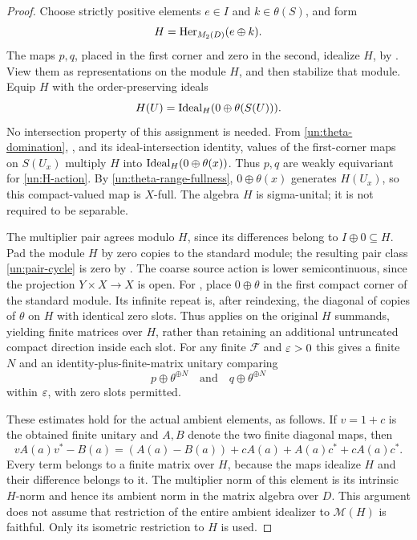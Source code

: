 \begin{proof}
Choose strictly positive elements $e\in I$ and $k\in\theta(S)$,
and form
\[
 H=\operatorname{Her}_{M_2(D)}(e\oplus k).
\]
The maps $p,q$, placed in the first corner and zero in the second,
idealize $H$, by .  View them as
representations on the module $H$, and then stabilize that module.
Equip $H$ with the order-preserving ideals
\begin{equation}\label{un:H-action}
 H(U)=\operatorname{Ideal}_H(0\oplus\theta(S(U))).
\end{equation}
No intersection property of this assignment is needed.  From
\eqref{un:theta-domination}, , and its
ideal-intersection identity, values of the first-corner maps on
$S(U_x)$ multiply $H$ into
$\operatorname{Ideal}_H(0\oplus\theta(x))$.  Thus $p,q$ are weakly equivariant
for \eqref{un:H-action}.  By \eqref{un:theta-range-fullness},
$0\oplus\theta(x)$ generates $H(U_x)$, so this compact-valued map
is $X$-full.  The algebra $H$ is sigma-unital; it is not required
to be separable.

The multiplier pair agrees modulo $H$, since its differences
belong to $I\oplus0\subseteq H$.  Pad the module $H$ by zero
copies to the standard module; the resulting pair class
\eqref{un:pair-cycle} is zero by .
The coarse source action is lower semicontinuous, since the
projection $Y\times X\to X$ is open.  For
, place $0\oplus\theta$ in the first
compact corner of the standard module.  Its infinite repeat
is, after reindexing, the diagonal of copies of $\theta$ on $H$
with identical zero slots.  Thus 
applies on the original $H$ summands, yielding finite matrices
over $H$, rather than retaining an additional untruncated compact
direction inside each slot.  For any finite $\mathcal F$ and
$\varepsilon>0$ this gives a finite $N$ and an identity-plus-finite-matrix
unitary comparing
\begin{equation}\label{un:finite-spare-comparison}
 p\oplus\theta^{\oplus N}
 \quad\text{and}\quad
 q\oplus\theta^{\oplus N}
\end{equation}
within $\varepsilon$, with zero slots permitted.

These estimates hold for the actual ambient elements, as follows.
If $v=1+c$ is the obtained finite unitary and $A,B$ denote the
two finite diagonal maps, then
\begin{equation}\label{un:ambient-error}
 vA(a)v^*-B(a)
 =(A(a)-B(a))+cA(a)+A(a)c^*+cA(a)c^*.
\end{equation}
Every term belongs to a finite matrix over $H$, because the maps
idealize $H$ and their difference belongs to it.  The multiplier
norm of this element is its intrinsic $H$-norm and hence its
ambient norm in the matrix algebra over $D$.  This argument does
not assume that restriction of the entire ambient idealizer to
$\mathcal M(H)$ is faithful.  Only its isometric restriction to
$H$ is used.


\end{proof}
